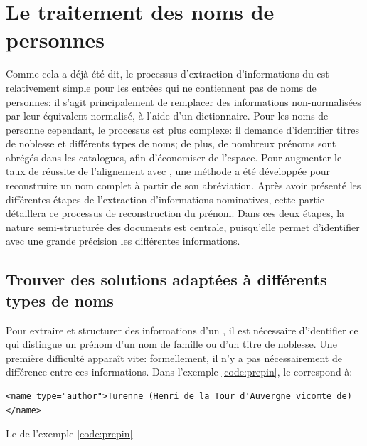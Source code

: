\section{Le traitement des noms de personnes}
Comme cela a déjà été dit, le processus d'extraction d'informations du \tname{} est relativement simple pour les entrées qui ne contiennent pas de noms de personnes: il s'agit principalement de remplacer des informations non-normalisées par leur équivalent normalisé, à l'aide d'un dictionnaire. Pour les noms de personne cependant, le processus est plus complexe: il demande d'identifier titres de noblesse et différents types de noms; de plus, de nombreux prénoms sont abrégés dans les catalogues, afin d'économiser de l'espace. Pour augmenter le taux de réussite de l'alignement avec \wkd{}, une méthode a été développée pour reconstruire un nom complet à partir de son abréviation. Après avoir présenté les différentes étapes de l'extraction d'informations nominatives, cette partie détaillera ce processus de reconstruction du prénom. Dans ces deux étapes, la nature semi-structurée des documents est centrale, puisqu'elle permet d'identifier avec une grande précision les différentes informations.

\subsection{Trouver des solutions adaptées à différents types de noms}
Pour extraire et structurer des informations d'un \tname{}, il est nécessaire d'identifier ce qui distingue un prénom d'un nom de famille ou d'un titre de noblesse. Une première difficulté apparaît vite: formellement, il n'y a pas nécessairement de différence entre ces informations. Dans l'exemple \ref{code:prepin}, le \tname{} correspond à:

\begin{listing}[h!]
	\centering
	\begin{verbatim}
<name type="author">Turenne (Henri de la Tour d'Auvergne vicomte de)</name>
	\end{verbatim}
	\caption{Le \tname{} de l'exemple \ref{code:prepin}}
	\label{code:prepin_teiname}
\end{listing}

